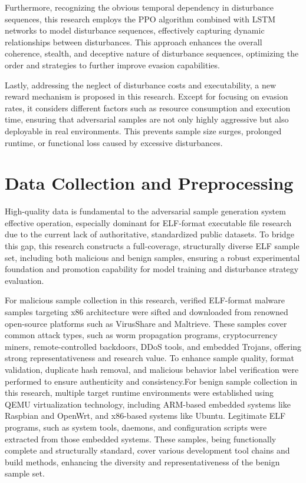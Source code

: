 Furthermore, recognizing the obvious temporal dependency in disturbance sequences, this research employs the PPO algorithm combined with LSTM networks to model disturbance sequences, effectively capturing dynamic relationships between disturbances. This approach enhances the overall coherence, stealth, and deceptive nature of disturbance sequences, optimizing the order and strategies to further improve evasion capabilities.

Lastly, addressing the neglect of disturbance costs and executability, a new reward mechanism is proposed in this research. Except for focusing on evasion rates, it considers different factors such as resource consumption and execution time, ensuring that adversarial samples are not only highly aggressive but also deployable in real environments. This prevents sample size surges, prolonged runtime, or functional loss caused by excessive disturbances.

\section{Data Collection and Preprocessing}

High-quality data is fundamental to the adversarial sample generation system effective operation, especially dominant for ELF-format executable file research due to the current lack of authoritative, standardized public datasets. To bridge this gap, this research constructs a full-coverage, structurally diverse ELF sample set, including both malicious and benign samples, ensuring a robust experimental foundation and promotion capability for model training and disturbance strategy evaluation.

For malicious sample collection in this research, verified ELF-format malware samples targeting x86 architecture were sifted and downloaded from renowned open-source platforms such as VirusShare\cite{VirusShare} and Maltrieve. These samples cover common attack types, such as worm propagation programs, cryptocurrency miners, remote-controlled backdoors, DDoS tools, and embedded Trojans, offering strong representativeness and research value. To enhance sample quality, format validation, duplicate hash removal, and malicious behavior label verification were performed to ensure authenticity and consistency.For benign sample collection in this research, multiple target runtime environments were established using QEMU virtualization technology, including ARM-based embedded systems like Raspbian and OpenWrt, and x86-based systems like Ubuntu. Legitimate ELF programs, such as system tools, daemons, and configuration scripts were extracted from those embedded systems. These samples, being functionally complete and structurally standard, cover various development tool chains and build methods, enhancing the diversity and representativeness of the benign sample set.

